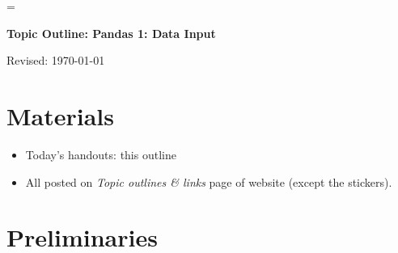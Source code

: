 


\pagestyle{headandfoot}
\runningheadrule
\firstpageheadrule
{}
\runningheader{}{}{}
\runningfooter{}{}{}


\parskip=\bigskipamount

\bigskip\bigskip
\centerline{\Large \bf Topic Outline:  Pandas 1:  Data Input}
\medskip
\centerline{Revised: \today}


\section*{Materials}

\begin{itemize}
\item  Today's handouts:  this outline
\item  All posted on {\it Topic outlines \& links\/} page of website (except the stickers).
\end{itemize}


\section*{Preliminaries}

